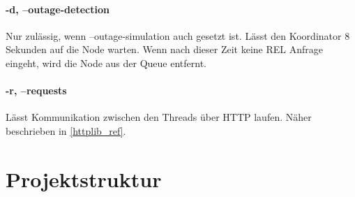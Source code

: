 \documentclass[12pt, letterpaper]{article}
\begin{document}
\paragraph{-d, --outage-detection}
Nur zulässig, wenn --outage-simulation auch gesetzt ist. Lässt den Koordinator 8 Sekunden auf die Node warten. Wenn nach dieser Zeit keine REL Anfrage eingeht, wird die Node aus der Queue entfernt.

\paragraph{-r, --requests}
Lässt Kommunikation zwischen den Threads über HTTP laufen. Näher beschrieben in \ref{httplib_ref}.

\newpage

\section{Projektstruktur}
\hfill

\newpage


\end{document}
